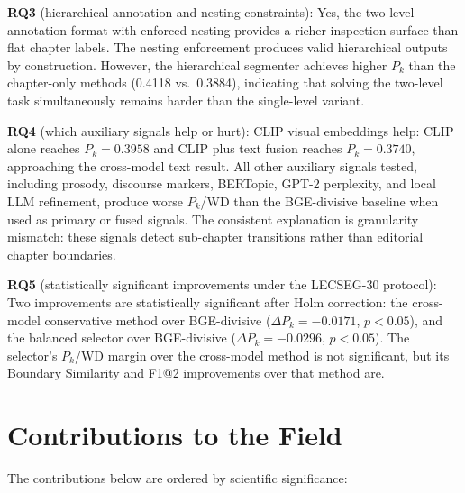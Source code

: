 \textbf{RQ3} (hierarchical annotation and nesting constraints):
Yes, the two-level annotation format with enforced nesting provides a richer
inspection surface than flat chapter labels.
The nesting enforcement produces valid hierarchical outputs by construction.
However, the hierarchical segmenter achieves higher $P_k$ than the
chapter-only methods (0.4118 vs.\ 0.3884), indicating that solving the
two-level task simultaneously remains harder than the single-level variant.

\textbf{RQ4} (which auxiliary signals help or hurt):
CLIP visual embeddings help: CLIP alone reaches $P_k=0.3958$ and CLIP plus
text fusion reaches $P_k=0.3740$, approaching the cross-model text result.
All other auxiliary signals tested, including prosody, discourse markers,
BERTopic, GPT-2 perplexity, and local LLM refinement, produce worse $P_k$/WD
than the BGE-divisive baseline when used as primary or fused signals.
The consistent explanation is granularity mismatch: these signals detect
sub-chapter transitions rather than editorial chapter boundaries.

\textbf{RQ5} (statistically significant improvements under the LECSEG-30 protocol):
Two improvements are statistically significant after Holm correction:
the cross-model conservative method over BGE-divisive ($\Delta P_k=-0.0171$,
$p<0.05$), and the balanced selector over BGE-divisive ($\Delta P_k=-0.0296$,
$p<0.05$).
The selector's $P_k$/WD margin over the cross-model method is not significant,
but its Boundary Similarity and F1@2 improvements over that method are.

\section{Contributions to the Field}

The contributions below are ordered by scientific significance:

